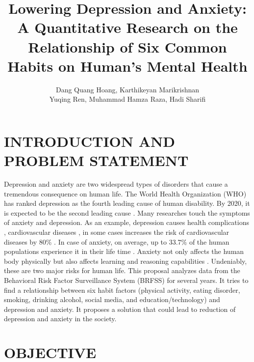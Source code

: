 \documentclass[letterpaper, 10 pt, conference]{ieeeconf}  %
\title{\LARGE \bf
Lowering Depression and Anxiety: A Quantitative Research on the Relationship of Six Common Habits 
on Human's Mental Health
}
\author{Dang Quang Hoang, Karthikeyan Marikrishnan \\ Yuqing Ren, Muhammad Hamza Raza, Hadi Sharifi}
\begin{document}
\maketitle
\thispagestyle{empty}
\pagestyle{empty}






\section{INTRODUCTION AND PROBLEM STATEMENT}
Depression and anxiety are two widespread types of disorders that cause a tremendous consequence on human life.  
The World Health Organization (WHO) has ranked depression as the fourth leading cause of human disability.
By 2020, it is expected to be the second leading cause \cite{kessler2013epidemiology}. Many researches touch the symptoms of anxiety and depression.
As an example, depression causes health 
complications \cite{verma2017impact}, cardiovascular diseases \cite{bradley2015depression}, in some cases increases 
the risk of cardiovascular diseases by 80\% \cite{penninx2017depression}. In case of anxiety, on average, up to 33.7\% of 
the human populations experience it in their life time \cite{bandelow2015epidemiology}. Anxiety not only affects the human body physically
but also affects learning and reasoning capabilities \cite{spielberger2013effects}\cite{darke1988effects}. 
Undeniably, these are two major risks for human life.
This proposal analyzes data from the Behavioral Risk Factor Surveillance System (BRFSS)\cite{brfss} for several years. 
It tries to find a relationship between six habit factors (physical activity, eating disorder, 
smoking, drinking alcohol, social media, and education/technology) and depression and anxiety. It proposes a
solution that could lead to reduction of depression and anxiety in the society. 

\section{OBJECTIVE}
\end{document}
